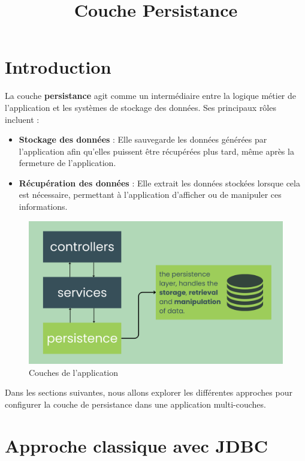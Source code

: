 \documentclass{article}
\title{Couche Persistance}
\begin{document}
\maketitle

\section{Introduction}
La couche \textbf{ persistance} agit comme un intermédiaire entre la logique métier de l'application et les systèmes de stockage des données. Ses principaux rôles incluent :
\begin{itemize}
    
    \item \textbf{Stockage des données} : Elle sauvegarde les données générées par l'application afin qu'elles puissent être récupérées plus tard, même après la fermeture de l'application.

    \item \textbf{Récupération des données} : Elle extrait les données stockées lorsque cela est nécessaire, permettant à l'application d'afficher ou de manipuler ces informations.
    
\end{itemize}

\begin{figure}[H]
    \centering
    \begin{framed}
        \includegraphics[width=0.8\linewidth]{images/persistence.png}
    \end{framed}
    \caption{Couches de l'application}
    \label{fig:spring-logo}
\end{figure}

Dans les sections suivantes, nous allons explorer les différentes approches pour configurer la couche de persistance dans une application multi-couches.


\section{Approche classique avec JDBC}
\end{document}
